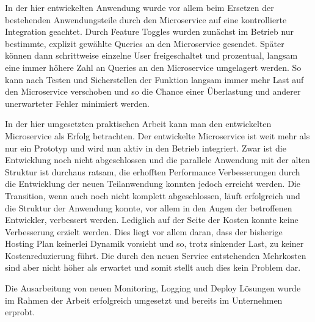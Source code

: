 In der hier entwickelten Anwendung wurde vor allem beim Ersetzen der bestehenden Anwendungsteile durch den Microservice auf eine kontrollierte Integration geachtet. Durch Feature Toggles wurden zunächst im Betrieb nur bestimmte, explizit gewählte Queries an den Microservice gesendet. Später können dann schrittweise einzelne User freigeschaltet und prozentual, langsam eine immer höhere Zahl an Queries an den Microservice umgelagert werden. So kann nach Testen und Sicherstellen der Funktion langsam immer mehr Last auf den Microservice verschoben und so die Chance einer Überlastung und anderer unerwarteter Fehler minimiert werden.

In der hier umgesetzten praktischen Arbeit kann man den entwickelten Microservice als Erfolg betrachten. Der entwickelte Microservice ist weit mehr als nur ein Prototyp und wird nun aktiv in den Betrieb integriert. Zwar ist die Entwicklung noch nicht abgeschlossen und die parallele Anwendung mit der alten Struktur ist durchaus ratsam, die erhofften Performance Verbesserungen durch die Entwicklung der neuen Teilanwendung konnten jedoch erreicht werden. Die Transition, wenn auch noch nicht komplett abgeschlossen, läuft erfolgreich und die Struktur der Anwendung konnte, vor allem in den Augen der betroffenen Entwickler, verbessert werden. Lediglich auf der Seite der Kosten konnte keine Verbesserung erzielt werden. Dies liegt vor allem daran, dass der bisherige Hosting Plan keinerlei Dynamik vorsieht und so, trotz sinkender Last, zu keiner Kostenreduzierung führt. Die durch den neuen Service entstehenden Mehrkosten sind aber nicht höher als erwartet und somit stellt auch dies kein Problem dar.

Die Ausarbeitung von neuen Monitoring, Logging und Deploy Lösungen wurde im Rahmen der Arbeit erfolgreich umgesetzt und bereits im Unternehmen erprobt.


